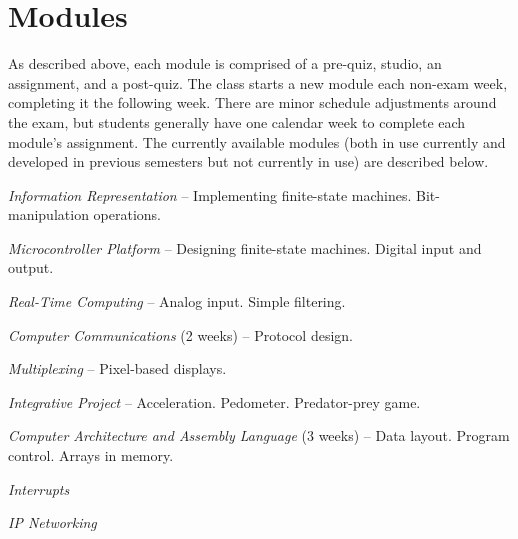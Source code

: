 \section{Modules}
\label{sec:weeks}

As described above, each module is comprised of a pre-quiz, studio,
an assignment, and a post-quiz.  The class starts a new module each
non-exam week, completing it the following week. There are minor schedule
adjustments around the exam, but students generally have one calendar week
to complete each module's assignment.  The currently available modules
(both in use currently and developed in previous semesters but not
currently in use) are described below.

\emph{Information Representation} -- Implementing finite-state machines.
Bit-manipulation operations.

\emph{Microcontroller Platform} -- Designing finite-state machines.
Digital input and output.

\emph{Real-Time Computing} -- Analog input. Simple filtering.

\emph{Computer Communications} (2 weeks) -- Protocol design.

\emph{Multiplexing} -- Pixel-based displays.

\emph{Integrative Project} -- Acceleration. Pedometer. Predator-prey game.

\emph{Computer Architecture and Assembly Language} (3 weeks) -- Data layout.
Program control. Arrays in memory.


\emph{Interrupts}

\emph{IP Networking}
